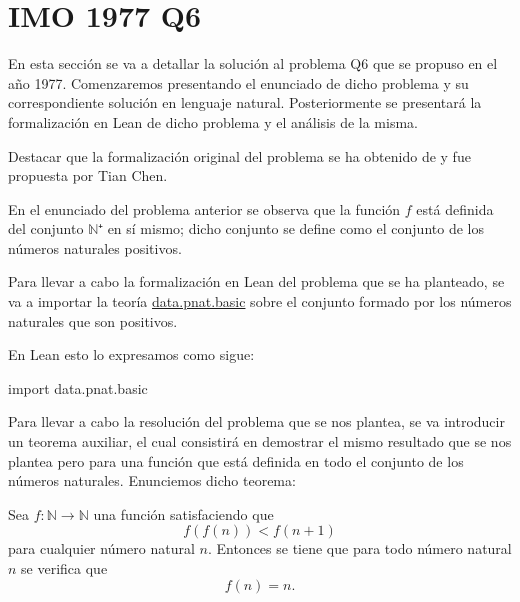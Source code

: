 \section{IMO 1977 Q6}

En esta sección se va a detallar la solución al problema Q6 que se
propuso en el año 1977. Comenzaremos presentando el enunciado de dicho
problema y su correspondiente solución en lenguaje
natural. Posteriormente se presentará la formalización en Lean de dicho
problema y el análisis de la misma.

Destacar que la formalización original del problema se ha obtenido de
\cite{TC} y fue propuesta por Tian Chen.

\noindent
{}

\begin{nota}
  En el enunciado del problema anterior se observa que la función \(f\)
  está definida del conjunto \(ℕ⁺\) en sí mismo; dicho conjunto se
  define como el conjunto de los números naturales positivos.
\end{nota}

Para llevar a cabo la formalización en Lean del problema que
se ha planteado, se va a importar la teoría
\href{https://github.com/leanprover-community/mathlib/blob/
  master/src/data/pnat/basic.lean}{data.pnat.basic} sobre el conjunto
formado por los números naturales que son positivos.

En Lean esto lo expresamos como sigue:
\begin{leancode}
import data.pnat.basic
\end{leancode}

Para llevar a cabo la resolución del problema que se nos plantea,
se va introducir un teorema auxiliar, el cual consistirá en
demostrar el mismo resultado que se nos plantea pero para una
función que está definida en todo el conjunto de los números
naturales. Enunciemos dicho teorema:

\begin{teorema}[Extension]\label{extension}
  Sea \(f:ℕ → ℕ\) una función satisfaciendo que
  \begin{equation}
    f(f(n)) < f(n+1)
  \end{equation}
  para cualquier número natural \(n\). Entonces se tiene que
  para todo número natural \(n\) se verifica que
  \begin{equation}
    f(n) = n.
  \end{equation}
\end{teorema}

